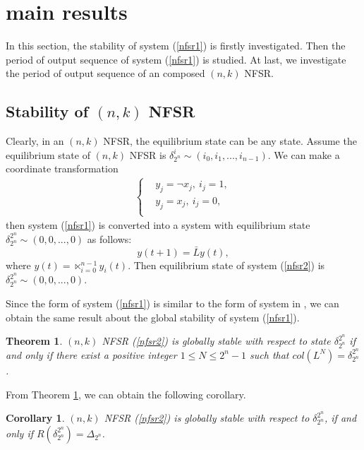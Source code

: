 \documentclass[conference]{IEEEtran}
\newtheorem{theorem}{Theorem}
\newtheorem{corollary}{Corollary}
\begin{document}
\section{main results}
In this section, the stability of system (\ref{nfsr1}) is firstly investigated. Then the period of output sequence of system (\ref{nfsr1}) is studied. At last, we investigate the period of output sequence of an composed $(n,k)$ NFSR.

\subsection{Stability of $(n,k)$ NFSR}

Clearly, in an $(n,k)$ NFSR, the equilibrium state can be any state. Assume the equilibrium state of $(n,k)$ NFSR is $\delta^i_{2^n}\sim (i_0,i_1,...,i_{n-1})$. We can make a coordinate transformation
 \begin{eqnarray}\label{nfsr}
 \left\{ \begin{aligned}
&y_j=\neg x_j,~i_j=1,\\
&y_j=x_j,~i_j=0,\\
\end{aligned} \right.
\end{eqnarray}
then system (\ref{nfsr1}) is converted into a system with equilibrium state $\delta^{2^n}_{2^n}\sim(0,0,...,0)$ as follows:
\begin{equation}\label{nfsr2}
y(t+1)=\bar{L}y(t),
\end{equation}
where $y(t)=\ltimes^{n-1}_{i=0}y_i(t)$. Then equilibrium state of system (\ref{nfsr2}) is $\delta^{2^n}_{2^n}\sim(0,0,...,0)$.

Since the form of system (\ref{nfsr1}) is similar to the form of system in \cite{Zhong2014Stability}, we can obtain the same result about the global stability of system (\ref{nfsr1}).

\begin{theorem}\label{th1}
$(n,k)$ NFSR (\ref{nfsr2}) is globally stable with respect to state $\delta^{2^n}_{2^n}$ if and only if there exist a positive integer $1\leq N\leq 2^n-1$ such that $col(L^N)=\delta^{2^n}_{2^n}$.
\end{theorem}

From Theorem \ref{th1}, we can obtain the following corollary.

\begin{corollary}
$(n,k)$ NFSR (\ref{nfsr2}) is globally stable with respect to  $\delta^{2^n}_{2^n}$, if and only if $R(\delta^{2^n}_{2^n})=\Delta_{2^n}$.
\end{corollary}
\end{document}
